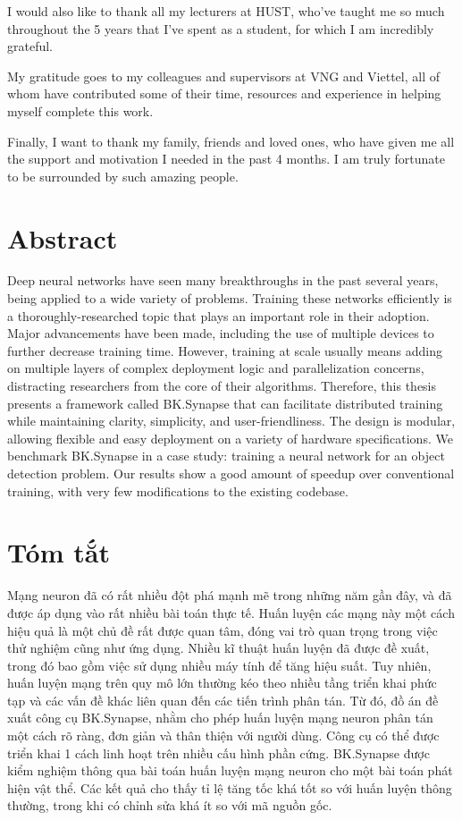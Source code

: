 \documentclass[a4paper, 12pt, oneside]{report}
\begin{document}
I would also like to thank all my lecturers at HUST, who've taught me so much throughout the 5 years that I've spent as a student, for which I am incredibly grateful.

My gratitude goes to my colleagues and supervisors at VNG and Viettel, all of whom have contributed some of their time, resources and experience in helping myself complete this work.

Finally, I want to thank my family, friends and loved ones, who have given me all the support and motivation I needed in the past 4 months. I am truly fortunate to be surrounded by such amazing people.

\pagebreak

\chapter*{Abstract}
Deep neural networks have seen many breakthroughs in the past several years, being applied to a wide variety of problems. Training these networks efficiently is a thoroughly-researched topic that plays an important role in their adoption. Major advancements have been made, including the use of multiple devices to further decrease training time. However, training at scale usually means adding on multiple layers of complex deployment logic and parallelization concerns, distracting researchers from the core of their algorithms. Therefore, this thesis presents a framework called BK.Synapse that can facilitate distributed training while maintaining clarity, simplicity, and user-friendliness. The design is modular, allowing flexible and easy deployment on a variety of hardware specifications. We benchmark BK.Synapse in a case study: training a neural network for an object detection problem. Our results show a good amount of speedup over conventional training, with very few modifications to the existing codebase.

\chapter*{Tóm tắt}
Mạng neuron đã có rất nhiều đột phá mạnh mẽ trong những năm gần đây, và đã được áp dụng vào rất nhiều bài toán thực tế. Huấn luyện các mạng này một cách hiệu quả là một chủ đề rất được quan tâm, đóng vai trò quan trọng trong việc thử nghiệm cũng như ứng dụng. Nhiều kĩ thuật huấn luyện đã được đề xuất, trong đó bao gồm việc sử dụng nhiều máy tính để tăng hiệu suất. Tuy nhiên, huấn luyện mạng trên quy mô lớn thường kéo theo nhiều tầng triển khai phức tạp và các vấn đề khác liên quan đến các tiến trình phân tán. Từ đó, đồ án đề xuất công cụ BK.Synapse, nhằm cho phép huấn luyện mạng neuron phân tán một cách rõ ràng, đơn giản và thân thiện với người dùng. Công cụ có thể được triển khai 1 cách linh hoạt trên nhiều cấu hình phần cứng. BK.Synapse được kiểm nghiệm thông qua bài toán huấn luyện mạng neuron cho một bài toán phát hiện vật thể. Các kết quả cho thấy tỉ lệ tăng tốc khá tốt so với huấn luyện thông thường, trong khi có chỉnh sửa khá ít so với mã nguồn gốc.
\end{document}
